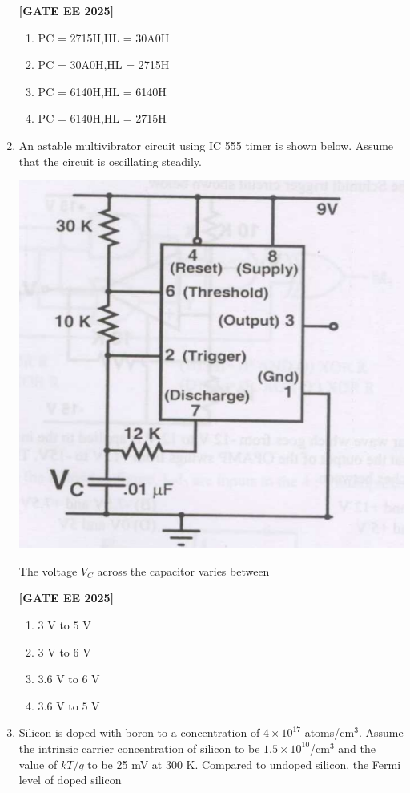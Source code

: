 \documentclass[12pt]{article}
\begin{document}
\begin{enumerate}[leftmargin=*, label=\textbf{Q.\arabic*:}]
\noindent \textbf{[GATE EE 2025]}
\begin{enumerate}
  \item PC = 2715H,\quad HL = 30A0H
  \item PC = 30A0H,\quad HL = 2715H
  \item PC = 6140H,\quad HL = 6140H
  \item PC = 6140H,\quad HL = 2715H
\end{enumerate}

\item An astable multivibrator circuit using IC 555 timer is shown below. Assume that the circuit is oscillating steadily.

\begin{center}
\includegraphics[width=0.7\columnwidth]{figs/q50.png}
\end{center}

The voltage $V_C$ across the capacitor varies between
 
\noindent \textbf{[GATE EE 2025]}
\begin{enumerate}
    \item $3$ V to $5$ V
    \item $3$ V to $6$ V
    \item $3.6$ V to $6$ V
    \item $3.6$ V to $5$ V
\end{enumerate}

\item Silicon is doped with boron to a concentration of $4 \times 10^{17}$ atoms/cm$^3$. Assume the intrinsic carrier concentration of silicon to be $1.5\times10^{10}$/cm$^3$ and the value of $kT/q$ to be 25 mV at 300 K. Compared to undoped silicon, the Fermi level of doped silicon
 

\end{enumerate}
\end{document}
